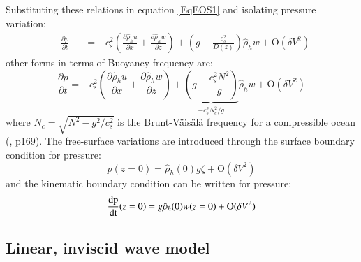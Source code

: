 \documentclass[a4paper,11pt]{article}
\begin{document}
Substituting these relations in equation \ref{EqEOS1} and isolating pressure variation:
\begin{subequations}
  \begin{alignat}{2}
 \nonumber& \frac{\partial p}{\partial t} &&=
 -c_s^{2}\left(\frac{\partial \hat{\rho}_h u}{\partial x}
 +\frac{\partial \hat{\rho}_h w}{\partial z}\right)
 +\left(g-\frac{c_s^2}{D(z)}\right)\hat{\rho}_h w+\mathrm{O}(\delta V^2)
  \end{alignat}
\end{subequations}
other forms in terms of Buoyancy frequency are:
\begin{equation}
 \frac{\partial p}{\partial t} =
 -c_s^{2}\left(\frac{\partial \hat{\rho}_h u}{\partial x}
 +\frac{\partial \hat{\rho}_h w}{\partial z}\right)
 +\underbrace{\left(g-\frac{c_s^2 N^2}{g}\right)}_{-c_s^2 N_c^2/g}
 \hat{\rho}_h w+\mathrm{O}(\delta V^2)
 \label{Eq_EOS1}
\end{equation}
where $N_c=\sqrt{N^2-g^2/c_s^2}$ is the Brunt-Väisälä frequency for a compressible ocean (\cite{gill_1982}, p169). The free-surface variations are introduced through the surface boundary condition for pressure:
\[
 p(z=0) = \hat{\rho}_h(0) g \zeta+\mathrm{O}(\delta V^2)
\]
 and the kinematic boundary condition can be written for pressure:
\[
 \frac{\rm{d}p}{\rm{dt}}(z=0)= g \hat{\rho}_h(0) w(z=0)+\mathrm{O}(\delta V^2)
\]

\bigbreak
\subsection{Linear, inviscid wave model}
\label{SubSectionLinModel}
\end{document}
